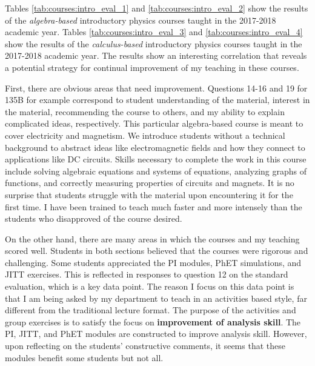 \documentclass[../../main.tex]{subfiles}
\begin{document}
Tables \ref{tab:courses:intro_eval_1} and \ref{tab:courses:intro_eval_2} show the results of the \textit{algebra-based} introductory physics courses taught in the 2017-2018 academic year.  Tables \ref{tab:courses:intro_eval_3} and \ref{tab:courses:intro_eval_4} show the results of the \textit{calculus-based} introductory physics courses taught in the 2017-2018 academic year.  The results show an interesting correlation that reveals a potential strategy for continual improvement of my teaching in these courses. \\ \hspace{0.1cm}

First, there are obvious areas that need improvement.  Questions 14-16 and 19 for 135B for example correspond to student understanding of the material, interest in the material, recommending the course to others, and my ability to explain complicated ideas, respectively.  This particular algebra-based course is meant to cover electricity and magnetism.  We introduce students without a technical background to abstract ideas like electromagnetic fields and how they connect to applications like DC circuits.  Skills necessary to complete the work in this course include solving algebraic equations and systems of equations, analyzing graphs of functions, and correctly measuring properties of circuits and magnets.  It is no surprise that students struggle with the material upon encountering it for the first time.  I have been trained to teach much faster and more intensely than the students who disapproved of the course desired. \\ \hspace{0.1cm}

On the other hand, there are many areas in which the courses and my teaching scored well.  Students in both sections believed that the courses were rigorous and challenging.  Some students appreciated the PI modules, PhET simulations, and JITT exercises.  This is reflected in responses to question 12 on the standard evaluation, which is a key data point.  The reason I focus on this data point is that I am being asked by my department to teach in an activities based style, far different from the traditional lecture format.  The purpose of the activities and group exercises is to satisfy the focus on \textbf{improvement of analysis skill}.  The PI, JITT, and PhET modules are constructed to improve analysis skill.  However, upon reflecting on the students' constructive comments, it seems that these modules benefit some students but not all. \\ \hspace{0.1cm}
\end{document}
